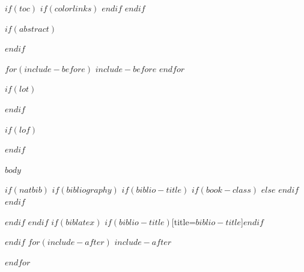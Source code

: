 \documentclass[$if(fontsize)$$fontsize$,$endif$$if(lang)$$babel-lang$,$endif$$if(papersize)$$papersize$paper,$endif$$for(classoption)$$classoption$$sep$,$endfor$]{$documentclass$}
\begin{document}
$if(toc)$
{
  $if(colorlinks)$
  \hypersetup{linkcolor=$if(toccolor)$$toccolor$$else$black$endif$}
  $endif$
  \setcounter{tocdepth}{$toc-depth$}
  \tableofcontents
  \pagebreak
}
$endif$

$if(abstract)$
  \begin{abstract}
    $abstract$
  \end{abstract}
  \pagebreak
$endif$

$for(include-before)$
$include-before$
$endfor$

$if(lot)$
  \listoftables
$endif$

$if(lof)$
  \listoffigures
$endif$

$body$

$if(natbib)$
$if(bibliography)$
$if(biblio-title)$
$if(book-class)$
\renewcommand\bibname{$biblio-title$}
$else$
\renewcommand\refname{$biblio-title$}
$endif$
$endif$


$endif$
$endif$
$if(biblatex)$
\printbibliography$if(biblio-title)$[title=$biblio-title$]$endif$

$endif$
$for(include-after)$
$include-after$

$endfor$
\end{document}
